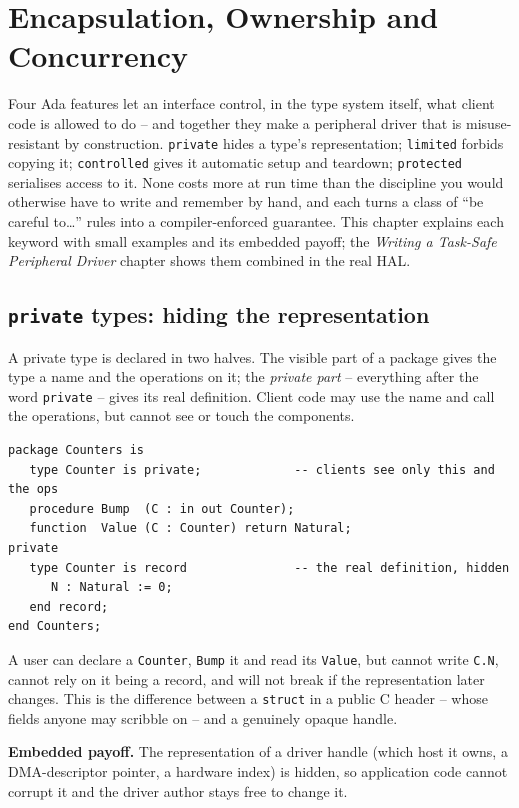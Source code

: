 \chapter{Encapsulation, Ownership and Concurrency}
\label{ch:encap}

Four Ada features let an interface control, in the type system itself, what client
code is allowed to do -- and together they make a peripheral driver that is
misuse-resistant by construction. \texttt{private} hides a type's representation;
\texttt{limited} forbids copying it; \texttt{controlled} gives it automatic setup
and teardown; \texttt{protected} serialises access to it. None costs more at run
time than the discipline you would otherwise have to write and remember by hand,
and each turns a class of ``be careful to\ldots'' rules into a compiler-enforced
guarantee. This chapter explains each keyword with small examples and its embedded
payoff; the \emph{Writing a Task-Safe Peripheral Driver} chapter shows them
combined in the real HAL.

\section{\texttt{private} types: hiding the representation}

A private type is declared in two halves. The visible part of a package gives the
type a name and the operations on it; the \emph{private part} -- everything after
the word \texttt{private} -- gives its real definition. Client code may use the
name and call the operations, but cannot see or touch the components.

\begin{lstlisting}
package Counters is
   type Counter is private;             -- clients see only this and the ops
   procedure Bump  (C : in out Counter);
   function  Value (C : Counter) return Natural;
private
   type Counter is record               -- the real definition, hidden
      N : Natural := 0;
   end record;
end Counters;
\end{lstlisting}

A user can declare a \texttt{Counter}, \texttt{Bump} it and read its
\texttt{Value}, but cannot write \texttt{C.N}, cannot rely on it being a record,
and will not break if the representation later changes. This is the difference
between a \texttt{struct} in a public C header -- whose fields anyone may scribble
on -- and a genuinely opaque handle.

\textbf{Embedded payoff.} The representation of a driver handle (which host it
owns, a DMA-descriptor pointer, a hardware index) is hidden, so application code
cannot corrupt it and the driver author stays free to change it.

